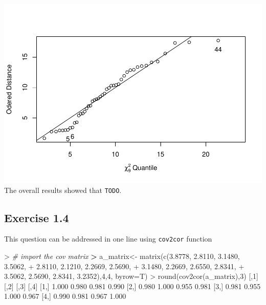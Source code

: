 \documentclass[
]{article}
\newenvironment{Shaded}{\begin{snugshade}}{\end{snugshade}}
\newcommand{\AttributeTok}[1]{\textcolor[rgb]{0.77,0.63,0.00}{#1}}
\newcommand{\CommentTok}[1]{\textcolor[rgb]{0.56,0.35,0.01}{\textit{#1}}}
\newcommand{\DecValTok}[1]{\textcolor[rgb]{0.00,0.00,0.81}{#1}}
\newcommand{\ErrorTok}[1]{\textcolor[rgb]{0.64,0.00,0.00}{\textbf{#1}}}
\newcommand{\FloatTok}[1]{\textcolor[rgb]{0.00,0.00,0.81}{#1}}
\newcommand{\FunctionTok}[1]{\textcolor[rgb]{0.00,0.00,0.00}{#1}}
\newcommand{\NormalTok}[1]{#1}
\newcommand{\OtherTok}[1]{\textcolor[rgb]{0.56,0.35,0.01}{#1}}
\newcommand{\SpecialCharTok}[1]{\textcolor[rgb]{0.00,0.00,0.00}{#1}}
\begin{document}
\includegraphics[width=0.5\linewidth,height=0.5\textheight]{hudm6122_hw_01_ChenguangPan_files/figure-latex/unnamed-chunk-4-1}
The overall results showed that \texttt{TODO}.

\hypertarget{exercise-1.4}{%
\subsection{Exercise 1.4}\label{exercise-1.4}}

This question can be addressed in one line using \texttt{cov2cor}
function

\begin{Shaded}
\begin{Highlighting}[]
\SpecialCharTok{\textgreater{}} \CommentTok{\# import the cov matrix}
\ErrorTok{\textgreater{}}\NormalTok{ a\_matrix}\OtherTok{\textless{}{-}} \FunctionTok{matrix}\NormalTok{(}\FunctionTok{c}\NormalTok{(}\FloatTok{3.8778}\NormalTok{, }\FloatTok{2.8110}\NormalTok{, }\FloatTok{3.1480}\NormalTok{, }\FloatTok{3.5062}\NormalTok{,}
\SpecialCharTok{+}                     \FloatTok{2.8110}\NormalTok{, }\FloatTok{2.1210}\NormalTok{, }\FloatTok{2.2669}\NormalTok{, }\FloatTok{2.5690}\NormalTok{,}
\SpecialCharTok{+}                     \FloatTok{3.1480}\NormalTok{, }\FloatTok{2.2669}\NormalTok{, }\FloatTok{2.6550}\NormalTok{, }\FloatTok{2.8341}\NormalTok{,}
\SpecialCharTok{+}                     \FloatTok{3.5062}\NormalTok{, }\FloatTok{2.5690}\NormalTok{, }\FloatTok{2.8341}\NormalTok{, }\FloatTok{3.2352}\NormalTok{),}\DecValTok{4}\NormalTok{,}\DecValTok{4}\NormalTok{, }\AttributeTok{byrow=}\NormalTok{T)}
\SpecialCharTok{\textgreater{}} \FunctionTok{round}\NormalTok{(}\FunctionTok{cov2cor}\NormalTok{(a\_matrix),}\DecValTok{3}\NormalTok{)}
\NormalTok{      [,}\DecValTok{1}\NormalTok{]  [,}\DecValTok{2}\NormalTok{]  [,}\DecValTok{3}\NormalTok{]  [,}\DecValTok{4}\NormalTok{]}
\NormalTok{[}\DecValTok{1}\NormalTok{,] }\FloatTok{1.000} \FloatTok{0.980} \FloatTok{0.981} \FloatTok{0.990}
\NormalTok{[}\DecValTok{2}\NormalTok{,] }\FloatTok{0.980} \FloatTok{1.000} \FloatTok{0.955} \FloatTok{0.981}
\NormalTok{[}\DecValTok{3}\NormalTok{,] }\FloatTok{0.981} \FloatTok{0.955} \FloatTok{1.000} \FloatTok{0.967}
\NormalTok{[}\DecValTok{4}\NormalTok{,] }\FloatTok{0.990} \FloatTok{0.981} \FloatTok{0.967} \FloatTok{1.000}
\end{Highlighting}
\end{Shaded}
\end{document}
